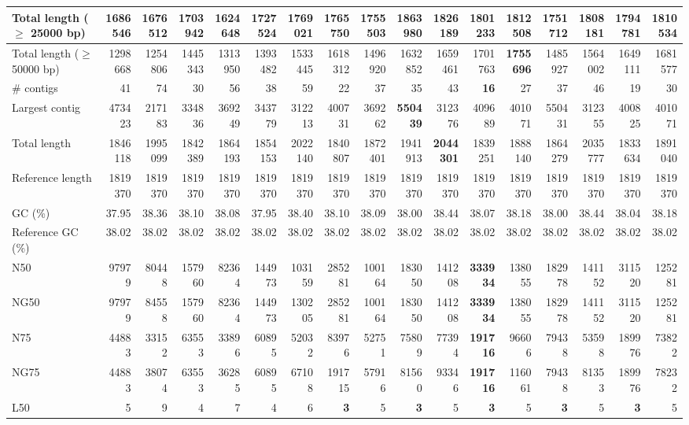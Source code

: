 \documentclass[12pt,a4paper]{article}
\begin{document}
\begin{table}[ht]
\begin{center}
\begin{tabular}{|l*{16}{|r}|}
Total length ($\geq$ 25000 bp) & 1686546 & 1676512 & 1703942 & 1624648 & 1727524 & 1769021 & 1765750 & 1755503 & {\bf 1863980} & 1826189 & 1801233 & 1812508 & 1751712 & 1808181 & 1794781 & 1810534 \\ \hline
Total length ($\geq$ 50000 bp) & 1298668 & 1254806 & 1445343 & 1313950 & 1393482 & 1533445 & 1618312 & 1496920 & 1632852 & 1659461 & 1701763 & {\bf 1755696} & 1485927 & 1564002 & 1649111 & 1681577 \\ \hline
\# contigs & 41 & 74 & 30 & 56 & 38 & 59 & 22 & 37 & 35 & 43 & {\bf 16} & 27 & 37 & 46 & 19 & 30 \\ \hline
Largest contig & 473423 & 217183 & 334836 & 369249 & 343779 & 312213 & 400731 & 369262 & {\bf 550439} & 312376 & 409689 & 401071 & 550431 & 312355 & 400825 & 401071 \\ \hline
Total length & 1846118 & 1995099 & 1842389 & 1864193 & 1854153 & 2022140 & 1840807 & 1872401 & 1941913 & {\bf 2044301} & 1839251 & 1888140 & 1864279 & 2035777 & 1833634 & 1891040 \\ \hline
Reference length & 1819370 & 1819370 & 1819370 & 1819370 & 1819370 & 1819370 & 1819370 & 1819370 & 1819370 & 1819370 & 1819370 & 1819370 & 1819370 & 1819370 & 1819370 & 1819370 \\ \hline
GC (\%) & 37.95 & 38.36 & 38.10 & 38.08 & 37.95 & 38.40 & 38.10 & 38.09 & 38.00 & 38.44 & 38.07 & 38.18 & 38.00 & 38.44 & 38.04 & 38.18 \\ \hline
Reference GC (\%) & 38.02 & 38.02 & 38.02 & 38.02 & 38.02 & 38.02 & 38.02 & 38.02 & 38.02 & 38.02 & 38.02 & 38.02 & 38.02 & 38.02 & 38.02 & 38.02 \\ \hline
N50 & 97979 & 80448 & 157960 & 82364 & 144973 & 103159 & 285281 & 100164 & 183050 & 141208 & {\bf 333934} & 138055 & 182978 & 141152 & 311520 & 125281 \\ \hline
NG50 & 97979 & 84558 & 157960 & 82364 & 144973 & 130205 & 285281 & 100164 & 183050 & 141208 & {\bf 333934} & 138055 & 182978 & 141152 & 311520 & 125281 \\ \hline
N75 & 44883 & 33152 & 63553 & 33896 & 60895 & 52032 & 83976 & 52751 & 75809 & 77394 & {\bf 191716} & 96606 & 79438 & 53598 & 189976 & 73822 \\ \hline
NG75 & 44883 & 38074 & 63553 & 36285 & 60895 & 67108 & 191715 & 57916 & 81560 & 93346 & {\bf 191716} & 116061 & 79438 & 81353 & 189976 & 78232 \\ \hline
L50 & 5 & 9 & 4 & 7 & 4 & 6 & {\bf 3} & 5 & {\bf 3} & 5 & {\bf 3} & 5 & {\bf 3} & 5 & {\bf 3} & 5 \\ \hline

\end{tabular}
\end{center}
\end{table}
\end{document}

